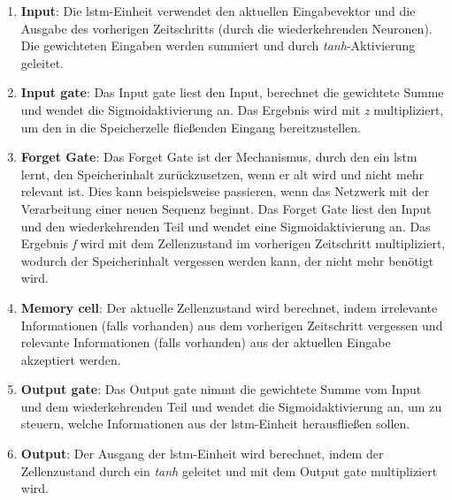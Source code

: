 \documentclass[
        ngerman,
        paper=a4,
        numbers=noendperiod,
]{scrreprt}
\begin{document}
\begin{enumerate}
    \item \textbf{Input}: Die \ac{lstm}-Einheit verwendet den aktuellen Eingabevektor und die Ausgabe des vorherigen Zeitschritts (durch die wiederkehrenden Neuronen). Die gewichteten Eingaben werden summiert und durch \textit{tanh}-Aktivierung geleitet.
    \item \textbf{Input gate}: Das Input gate liest den Input, berechnet die gewichtete Summe und wendet die Sigmoidaktivierung an. Das Ergebnis wird mit \textit{z} multipliziert, um den in die Speicherzelle fließenden Eingang bereitzustellen.
    \item \textbf{Forget Gate}: Das Forget Gate ist der Mechanismus, durch den ein \ac{lstm} lernt, den Speicherinhalt zurückzusetzen, wenn er alt wird und nicht mehr relevant ist. Dies kann beispielsweise passieren, wenn das Netzwerk mit der Verarbeitung einer neuen Sequenz beginnt. Das Forget Gate liest den Input und den wiederkehrenden Teil und wendet eine Sigmoidaktivierung an. Das Ergebnis \textit{f} wird mit dem Zellenzustand im vorherigen Zeitschritt multipliziert, wodurch der Speicherinhalt vergessen werden kann, der nicht mehr benötigt wird.
    \item \textbf{Memory cell}: Der aktuelle Zellenzustand wird berechnet, indem irrelevante Informationen (falls vorhanden) aus dem vorherigen Zeitschritt vergessen und relevante Informationen (falls vorhanden) aus der aktuellen Eingabe akzeptiert werden.
    \item \textbf{Output gate}: Das Output gate nimmt die gewichtete Summe vom Input und dem wiederkehrenden Teil und wendet die Sigmoidaktivierung an, um zu steuern, welche Informationen aus der \ac{lstm}-Einheit herausfließen sollen.
    \item \textbf{Output}: Der Ausgang der \ac{lstm}-Einheit wird berechnet, indem der Zellenzustand  durch ein \textit{tanh} geleitet und mit dem Output gate multipliziert wird.
\end{enumerate}
\end{document}
